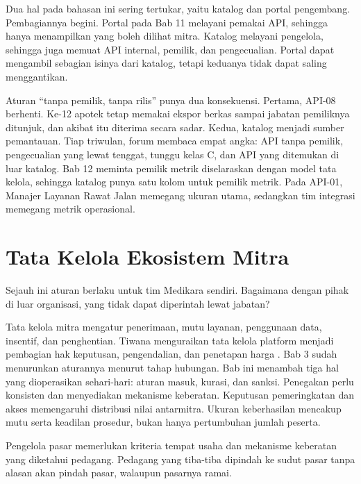 Dua hal pada bahasan ini sering tertukar, yaitu katalog dan portal pengembang. Pembagiannya begini. Portal pada Bab 11 melayani pemakai API, sehingga hanya menampilkan
yang boleh dilihat mitra. Katalog melayani pengelola, sehingga juga memuat API internal, pemilik, dan pengecualian. Portal dapat mengambil sebagian isinya dari katalog,
tetapi keduanya tidak dapat saling menggantikan.

Aturan ``tanpa pemilik, tanpa rilis'' punya dua konsekuensi. Pertama, API-08 berhenti. Ke-12 apotek tetap memakai ekspor berkas sampai jabatan pemiliknya ditunjuk, dan akibat
itu diterima secara sadar. Kedua, katalog menjadi sumber pemantauan. Tiap triwulan, forum membaca empat angka: API tanpa pemilik, pengecualian yang lewat tenggat, tunggu
kelas C, dan API yang ditemukan di luar katalog. Bab 12 meminta pemilik metrik diselaraskan dengan model tata kelola, sehingga katalog punya satu kolom untuk pemilik metrik.
Pada API-01, Manajer Layanan Rawat Jalan memegang ukuran utama, sedangkan tim integrasi memegang metrik operasional.

\section{Tata Kelola Ekosistem Mitra}

Sejauh ini aturan berlaku untuk tim Medikara sendiri. Bagaimana dengan pihak di luar organisasi, yang tidak dapat diperintah lewat jabatan?

Tata kelola mitra mengatur penerimaan, mutu layanan, penggunaan data, insentif, dan penghentian. Tiwana menguraikan tata kelola platform menjadi pembagian hak keputusan,
pengendalian, dan penetapan harga \cite{tiwana2014platform}. Bab 3 sudah menurunkan aturannya menurut tahap hubungan. Bab ini menambah tiga hal yang dioperasikan
sehari-hari: aturan masuk, kurasi, dan sanksi. Penegakan perlu konsisten dan menyediakan mekanisme keberatan. Keputusan pemeringkatan dan akses memengaruhi distribusi nilai
antarmitra. Ukuran keberhasilan mencakup mutu serta keadilan prosedur, bukan hanya pertumbuhan jumlah peserta.

Pengelola pasar memerlukan kriteria tempat usaha dan mekanisme keberatan yang diketahui pedagang. Pedagang yang tiba-tiba dipindah ke sudut pasar tanpa alasan akan pindah
pasar, walaupun pasarnya ramai.

